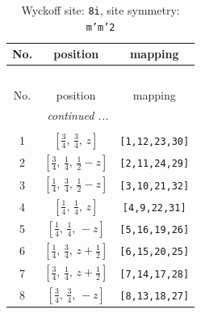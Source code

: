 \documentclass[fleqn,8pt]{jsarticle}
\begin{document}
\begin{longtable}{ccc}
\caption{Wyckoff site: {\tt 8i}, site symmetry: {\tt m'm'2}}
 \\
 \hline \hline
No. & position & mapping \\ \hline \endfirsthead

\multicolumn{2}{l}{\tablename\ \thetable{}} \\
 \hline \hline
No. & position & mapping \\ \hline \endhead

 \hline \hline
\multicolumn{2}{r}{\footnotesize\it continued ...} \\ \endfoot

 \hline \hline
\multicolumn{2}{r}{} \\ \endlastfoot

1 & $\left[ \frac{3}{4},\, \frac{3}{4},\, z \right]$ & {\tt [1,12,23,30]} \\ \hline
2 & $\left[ \frac{3}{4},\, \frac{1}{4},\, \frac{1}{2} - z \right]$ & {\tt [2,11,24,29]} \\ \hline
3 & $\left[ \frac{1}{4},\, \frac{3}{4},\, \frac{1}{2} - z \right]$ & {\tt [3,10,21,32]} \\ \hline
4 & $\left[ \frac{1}{4},\, \frac{1}{4},\, z \right]$ & {\tt [4,9,22,31]} \\ \hline
5 & $\left[ \frac{1}{4},\, \frac{1}{4},\, - z \right]$ & {\tt [5,16,19,26]} \\ \hline
6 & $\left[ \frac{1}{4},\, \frac{3}{4},\, z + \frac{1}{2} \right]$ & {\tt [6,15,20,25]} \\ \hline
7 & $\left[ \frac{3}{4},\, \frac{1}{4},\, z + \frac{1}{2} \right]$ & {\tt [7,14,17,28]} \\ \hline
8 & $\left[ \frac{3}{4},\, \frac{3}{4},\, - z \right]$ & {\tt [8,13,18,27]} \\
\end{longtable}
\renewcommand{\arraystretch}{1.2}
\end{document}
